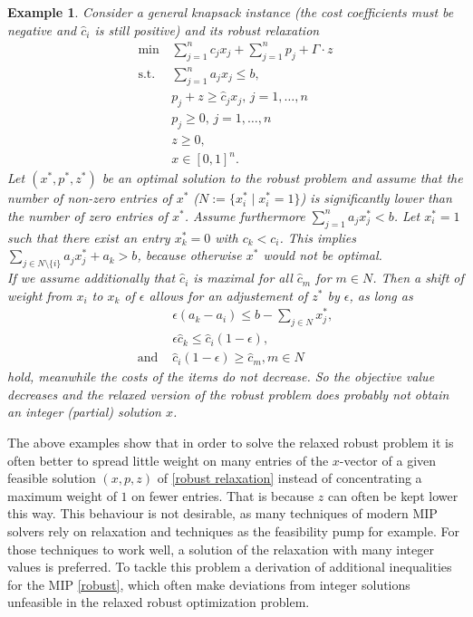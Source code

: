 \documentclass[titlepage, a4paper]{amsbook}
\theoremstyle{plain}
\theoremstyle{break}
\newtheorem{exm}[thm]{Example}
\theoremstyle{definition}
\theoremstyle{remark}
\numberwithin{equation}{thm}
\begin{document}
\begin{exm}
Consider a general knapsack instance (the cost coefficients must be negative and $\hat{c}_i$ is still positive)  and its robust relaxation
\begin{equation*}
\begin{split}
    \min\, &\sum_{j=1}^{n} c_j x_j + \sum_{j=1}^{n}p_j + \Gamma \cdot z\\
    \text{s.t. } &\sum_{j=1}^{n}a_j x_j \leq b, \\
    &p_j+ z \geq \hat{c}_jx_j, \, j=1, \ldots,n\\
  &p_j \geq 0, \, j=1, \ldots, n \\
  &z \geq 0, \\
    &x \in [0,1]^n.
\end{split}
\end{equation*}
Let $(x^*, p^*, z^*)$ be an optimal solution to the robust problem and assume that the number of non-zero entries of $x^*$ ($N:=\{x^*_i \mid x^*_i =1\}$) is significantly lower than the number of zero entries of $x^*$. Assume furthermore $\sum_{j=1}^{n}a_j x^*_j < b$.
Let $x^*_i=1$ such that there exist an entry $x^*_k=0$ with $c_k < c_i$. This implies $\sum_{j \in N\setminus\{i\}}a_j x^*_j + a_k > b$, because otherwise $x^*$ would not be optimal. \\
If we assume additionally that $\hat{c}_i$ is maximal for all $\hat{c}_m$ for $m \in N$. Then a shift of weight from $x_i$ to $x_k$ of $\epsilon$ allows for an adjustement of $z^*$ by $\epsilon$, as long as 
\begin{align*}
    &\epsilon (a_k - a_i) \leq b - \sum_{j \in N}x^*_j, \\
    &\epsilon \hat{c}_k \leq \hat{c}_i (1-\epsilon), \\
   \text{and } &\hat{c}_i (1-\epsilon) \geq \hat{c}_m, m \in N
\end{align*}
hold, meanwhile the costs of the items do not decrease. So the objective value decreases and the relaxed version of the robust problem does probably not obtain an integer (partial) solution $x$.
\end{exm}
The above examples show that in order to solve the relaxed robust problem it is often better to spread little weight on many entries of the $x$-vector of a given feasible solution $(x,p,z)$ of \eqref{robust relaxation} instead of concentrating a maximum weight of $1$ on fewer entries. That is because $z$ can often be kept lower this way. This behaviour is not desirable, as many techniques of modern MIP solvers rely on relaxation and techniques as the feasibility pump for example. For those techniques to work well, a solution of the relaxation with many integer values is preferred. To tackle this problem a derivation of additional inequalities for the MIP \eqref{robust}, which often make deviations from integer solutions unfeasible in the relaxed robust optimization problem.\\
\end{document}
